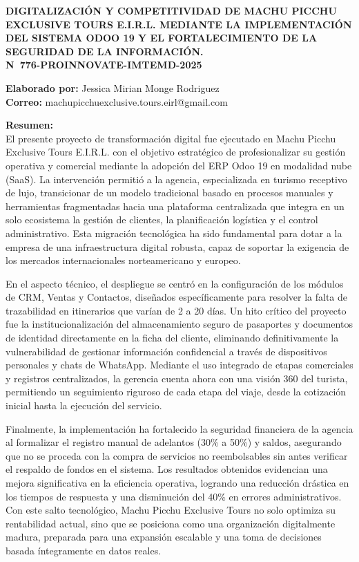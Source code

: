 \documentclass[12pt]{article}
\begin{document}
\vspace*{0.2cm}

\begin{center}
    {\large \textbf{DIGITALIZACIÓN Y COMPETITIVIDAD DE MACHU PICCHU EXCLUSIVE TOURS E.I.R.L. MEDIANTE LA IMPLEMENTACIÓN DEL SISTEMA ODOO 19 Y EL FORTALECIMIENTO DE LA SEGURIDAD DE LA INFORMACIÓN.}}\\[0.4cm]
    {\large \textbf{N\textdegree\ 776-PROINNOVATE-IMTEMD-2025}}
\end{center}

\textbf{Elaborado por:} Jessica Mirian Monge Rodriguez\\
\textbf{Correo:} machupicchuexclusive.tours.eirl@gmail.com

\textbf{Resumen:}\\
El presente proyecto de transformación digital fue ejecutado en Machu Picchu Exclusive Tours E.I.R.L. con el objetivo estratégico de profesionalizar su gestión operativa y comercial mediante la adopción del ERP Odoo 19 en modalidad nube (SaaS). La intervención permitió a la agencia, especializada en turismo receptivo de lujo, transicionar de un modelo tradicional basado en procesos manuales y herramientas fragmentadas hacia una plataforma centralizada que integra en un solo ecosistema la gestión de clientes, la planificación logística y el control administrativo. Esta migración tecnológica ha sido fundamental para dotar a la empresa de una infraestructura digital robusta, capaz de soportar la exigencia de los mercados internacionales norteamericano y europeo.

En el aspecto técnico, el despliegue se centró en la configuración de los módulos de CRM, Ventas y Contactos, diseñados específicamente para resolver la falta de trazabilidad en itinerarios que varían de 2 a 20 días. Un hito crítico del proyecto fue la institucionalización del almacenamiento seguro de pasaportes y documentos de identidad directamente en la ficha del cliente, eliminando definitivamente la vulnerabilidad de gestionar información confidencial a través de dispositivos personales y chats de WhatsApp. Mediante el uso integrado de etapas comerciales y registros centralizados, la gerencia cuenta ahora con una visión 360\textdegree{} del turista, permitiendo un seguimiento riguroso de cada etapa del viaje, desde la cotización inicial hasta la ejecución del servicio.

Finalmente, la implementación ha fortalecido la seguridad financiera de la agencia al formalizar el registro manual de adelantos (30\% a 50\%) y saldos, asegurando que no se proceda con la compra de servicios no reembolsables sin antes verificar el respaldo de fondos en el sistema. Los resultados obtenidos evidencian una mejora significativa en la eficiencia operativa, logrando una reducción drástica en los tiempos de respuesta y una disminución del 40\% en errores administrativos. Con este salto tecnológico, Machu Picchu Exclusive Tours no solo optimiza su rentabilidad actual, sino que se posiciona como una organización digitalmente madura, preparada para una expansión escalable y una toma de decisiones basada íntegramente en datos reales.
\end{document}
